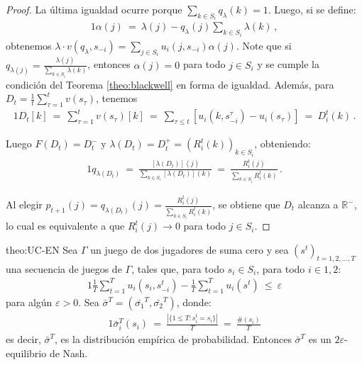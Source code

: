 \begin{proof}
La última igualdad ocurre porque $\sum_{k\in S_i} q_{\lambda}(k)=1$. Luego, si se define:
\begin{alignat}{1}
	\alpha(j)\ =\ \lambda(j) - q_{\lambda}(j) \sum_{k \in S_i} \lambda(k) \,,
\end{alignat}
obtenemos $\lambda \cdot v(q_{\lambda}, s_{-i}) = \sum_{j \in S_i} u_i(j, s_{-i})\alpha(j)$.
Note que si $q_{\lambda(j)} = \frac{\lambda(j)}{\sum_{k \in S_i} \lambda(k)}$, entonces $\alpha(j) = 0$ para todo $j \in S_i$ y se cumple la condición del Teorema \ref{theo:blackwell} en forma de igualdad. Además, para $D_t=\frac{1}{t} \sum_{\tau = 1}^{t} v(s_{\tau})$, tenemos
\begin{alignat}{1}
	D_t[k]\ =\ \sum_{\tau = 1}^{t} v(s_{\tau})[k]\ =\ \sum_{\tau \leq t }[u_i(k, s_{-i}^{\tau}) - u_i(s_{\tau})]\ =\  D_i^t(k) \,.
\end{alignat}

Luego $F(D_t) = D_t^-$ y $\lambda(D_t) = D_t^+ = (R_i^t(k))_{k \in S_i}$, obteniendo:
\begin{alignat}{1}
	q_{\lambda(D_t)}\ =\ \frac{[\lambda(D_t)](j)}{\sum_{k \in S_i}[\lambda(D_t)](k)}\ =\ \frac{R_i^t(j)}{\sum_{k \in S_i} R_i^t(k)} \,.
\end{alignat}

Al elegir $p_{t+1}(j) = q_{\lambda(D_t)}(j) = \frac{R_i^t (j)}{\sum_{k \in S_i} R_i^t(k)}$, se obtiene que $D_t$ alcanza a $\mathbb{R^-}$, lo cual es equivalente a que $R_i^t(j) \rightarrow 0$ para todo $j \in S_i$.
\end{proof}


\begin{reptheorem}{theo:UC-EN}
Sea $\Gamma$ un juego de dos jugadores de suma cero y sea $(s^t)_{t=1,2,..., T}$ una secuencia de juegos de $\Gamma$, tales que, para todo $s_i \in S_i$, para todo $i \in {1, 2}$:
\begin{alignat}{1}
\frac{1}{T}\sum_{t = 1}^{T}u_i(s_i, s_{-i}^t) - \frac{1}{T} \sum_{t = 1}^T u_i(s^t)\ \leq\ \varepsilon
\end{alignat}
para algún $\varepsilon > 0$. Sea $\bar{\sigma}^T = (\bar{\sigma_1}^T, \bar{\sigma_2}^T)$, donde:
\begin{alignat}{1}
\bar{\sigma}_i^T(s_i)\ =\ \frac{ |\{ 1 \leq T : s_i^t = s_i\}|}{T}\ =\ \frac{\#(s_i)}{T}
\end{alignat}
es decir, $\bar{\sigma}^T$, es la distribución empírica de probabilidad. Entonces $\bar{\sigma}^T$ es un $2\varepsilon$-equilibrio de Nash.
\end{reptheorem}

